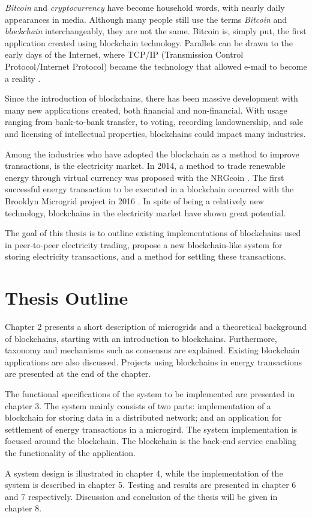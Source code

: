 \textit{Bitcoin} and \textit{cryptocurrency} have become household words, with nearly daily appearances in media. Although many people still use the terms \textit{Bitcoin} and \textit{blockchain} interchangeably, they are not the same. Bitcoin is, simply put, the first application created using blockchain technology. Parallels can be drawn to the early days of the Internet, where TCP/IP (Transmission Control Protocol/Internet Protocol) became the technology that allowed e-mail to become a reality \cite{hbr_truth}. 

Since the introduction of blockchains, there has been massive development with many new applications created, both financial and non-financial. With usage ranging from bank-to-bank transfer, to voting, recording landownership, and sale and licensing of intellectual properties, blockchains could impact many industries. 
 
Among the industries who have adopted the blockchain as a method to improve transactions, is the electricity market. In 2014, a method to trade renewable energy through virtual currency was proposed with the NRGcoin \cite{NRGcoin_Mihaylov}. The first successful energy transaction to be executed in a blockchain occurred with the Brooklyn Microgrid project in 2016 \cite{bm101}. In spite of being a relatively new technology, blockchains in the electricity market have shown great potential. 

The goal of this thesis is to outline existing implementations of blockchains used in peer-to-peer electricity trading, propose a new blockchain-like system for storing electricity transactions, and a method for settling these transactions. 



\section{Thesis Outline}
Chapter 2 presents a short description of microgrids and a theoretical background of blockchains, starting with an introduction to blockchains. Furthermore, taxonomy and mechanisms such as consensus are explained. Existing blockchain applications are also discussed. Projects using blockchains in energy transactions are presented at the end of the chapter. 

The functional specifications of the system to be implemented are presented in chapter 3. The system mainly consists of two parts: implementation of a blockchain for storing data in a distributed network; and an application for settlement of energy transactions in a microgird. The system implementation is focused around the blockchain. The blockchain is the back-end service enabling the functionality of the application.

A system design is illustrated in chapter 4, while the implementation of the system is described in chapter 5. Testing and results are presented in chapter 6 and 7 respectively. Discussion and conclusion of the thesis will be given in chapter 8.






